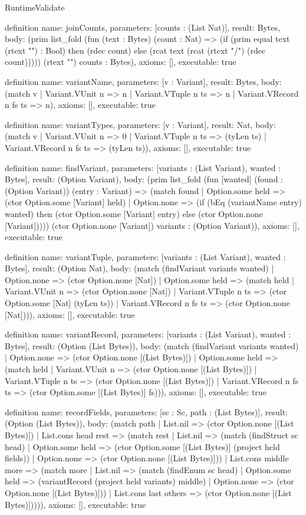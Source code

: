 \begin{lexlean}{RuntimeValidate}
\begin{semanticmodule}
definition{
  name: joinCounts,
  parameters: [counts : (List Nat)],
  result: Bytes,
  body: (prim list_fold (fun (text : Bytes) (count : Nat) => (if (prim equal text (rtext "") : Bool) then (rdec count) else (rcat text (rcat (rtext "/") (rdec count))))) (rtext "") counts : Bytes),
  axioms: [],
  executable: true
}

definition{
  name: variantName,
  parameters: [v : Variant],
  result: Bytes,
  body: (match v | Variant.VUnit n => n | Variant.VTuple n ts => n | Variant.VRecord n fs ts => n),
  axioms: [],
  executable: true
}

definition{
  name: variantTypes,
  parameters: [v : Variant],
  result: Nat,
  body: (match v
    | Variant.VUnit n => 0
    | Variant.VTuple n ts => (tyLen ts)
    | Variant.VRecord n fs ts => (tyLen ts)),
  axioms: [],
  executable: true
}

definition{
  name: findVariant,
  parameters: [variants : (List Variant), wanted : Bytes],
  result: (Option Variant),
  body: (prim list_fold (fun [wanted] (found : (Option Variant)) (entry : Variant) => (match found
    | Option.some held => (ctor Option.some [Variant] held)
    | Option.none => (if (bEq (variantName entry) wanted) then (ctor Option.some [Variant] entry) else (ctor Option.none [Variant])))) (ctor Option.none [Variant]) variants : (Option Variant)),
  axioms: [],
  executable: true
}

definition{
  name: variantTuple,
  parameters: [variants : (List Variant), wanted : Bytes],
  result: (Option Nat),
  body: (match (findVariant variants wanted)
    | Option.none => (ctor Option.none [Nat])
    | Option.some held => (match held
      | Variant.VUnit n => (ctor Option.none [Nat])
      | Variant.VTuple n ts => (ctor Option.some [Nat] (tyLen ts))
      | Variant.VRecord n fs ts => (ctor Option.none [Nat]))),
  axioms: [],
  executable: true
}

definition{
  name: variantRecord,
  parameters: [variants : (List Variant), wanted : Bytes],
  result: (Option (List Bytes)),
  body: (match (findVariant variants wanted)
    | Option.none => (ctor Option.none [(List Bytes)])
    | Option.some held => (match held
      | Variant.VUnit n => (ctor Option.none [(List Bytes)])
      | Variant.VTuple n ts => (ctor Option.none [(List Bytes)])
      | Variant.VRecord n fs ts => (ctor Option.some [(List Bytes)] fs))),
  axioms: [],
  executable: true
}

definition{
  name: recordFields,
  parameters: [sc : Sc, path : (List Bytes)],
  result: (Option (List Bytes)),
  body: (match path
    | List.nil => (ctor Option.none [(List Bytes)])
    | List.cons head rest => (match rest
      | List.nil => (match (findStruct sc head)
        | Option.some held => (ctor Option.some [(List Bytes)] (project held fields))
        | Option.none => (ctor Option.none [(List Bytes)]))
      | List.cons middle more => (match more
        | List.nil => (match (findEnum sc head)
          | Option.some held => (variantRecord (project held variants) middle)
          | Option.none => (ctor Option.none [(List Bytes)]))
        | List.cons last others => (ctor Option.none [(List Bytes)])))),
  axioms: [],
  executable: true
}


\end{semanticmodule}
\end{lexlean}
